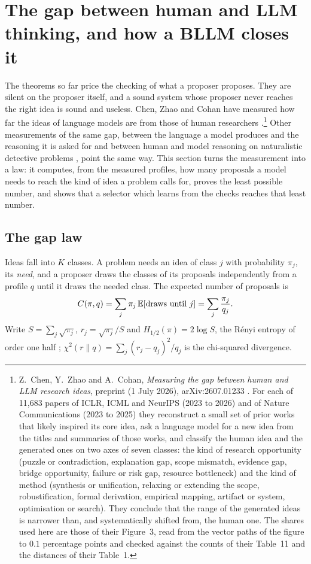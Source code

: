 \section{The gap between human and LLM thinking, and how a BLLM closes it}\label{sec:gap}

The theorems so far price the checking of what a proposer proposes. They are silent on the proposer itself, and a sound system whose proposer never reaches the right idea is sound and useless. Chen, Zhao and Cohan have measured how far the ideas of language models are from those of human researchers \cite{CZC26}.\footnote{Z.~Chen, Y.~Zhao and A.~Cohan, \emph{Measuring the gap between human and LLM research ideas}, preprint (1 July 2026), arXiv:2607.01233 \cite{CZC26}. For each of 11{,}683 papers of ICLR, ICML and NeurIPS (2023 to 2026) and of Nature Communications (2023 to 2025) they reconstruct a small set of prior works that likely inspired its core idea, ask a language model for a new idea from the titles and summaries of those works, and classify the human idea and the generated ones on two axes of seven classes: the kind of research opportunity (puzzle or contradiction, explanation gap, scope mismatch, evidence gap, bridge opportunity, failure or risk gap, resource bottleneck) and the kind of method (synthesis or unification, relaxing or extending the scope, robustification, formal derivation, empirical mapping, artifact or system, optimisation or search). They conclude that the range of the generated ideas is narrower than, and systematically shifted from, the human one. The shares used here are those of their Figure~3, read from the vector paths of the figure to $0.1$ percentage points and checked against the counts of their Table~11 and the distances of their Table~1.} Other measurements of the same gap, between the language a model produces and the reasoning it is asked for \cite{LCL25} and between human and model reasoning on naturalistic detective problems \cite{LG26}, point the same way. This section turns the measurement into a law: it computes, from the measured profiles, how many proposals a model needs to reach the kind of idea a problem calls for, proves the least possible number, and shows that a selector which learns from the checks reaches that least number.

\subsection{The gap law}

Ideas fall into $K$ classes. A problem needs an idea of class $j$ with probability $\pi_{j}$, its \emph{need}, and a proposer draws the classes of its proposals independently from a profile $q$ until it draws the needed class. The expected number of proposals is
\begin{equation}\label{eq:searchcost}
C(\pi,q)=\sum_{j}\pi_{j}\,\mathbb{E}[\text{draws until }j]=\sum_{j}\frac{\pi_{j}}{q_{j}} .
\end{equation}
Write $S=\sum_{j}\sqrt{\pi_{j}}$, $r_{j}=\sqrt{\pi_{j}}/S$ and $H_{1/2}(\pi)=2\log S$, the R\'enyi entropy of order one half \cite{Ren61}; $\chi^{2}(r\|q)=\sum_{j}(r_{j}-q_{j})^{2}/q_{j}$ is the chi-squared divergence.

